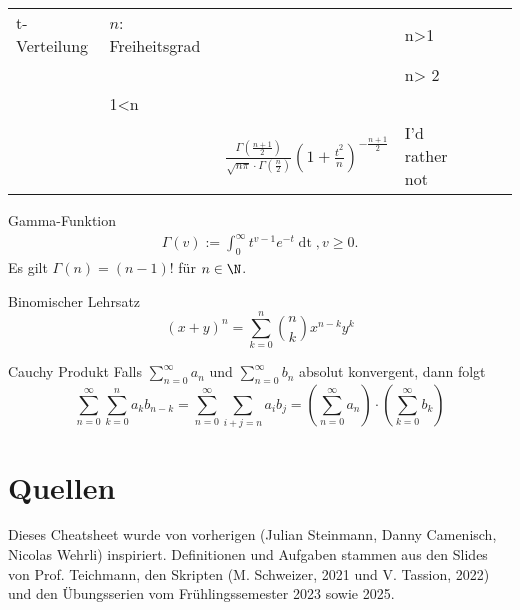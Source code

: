 \begin{center}
\begin{table*}
\begin{tabularx}{\textwidth}{llXXXX}
				t-Verteilung             & \( n \): Freiheitsgrad               & \( \begin{cases} 0 & n>1 \\ \text{undef.} & \text{sonst} \end{cases} \) & \( \begin{cases} \frac{n}{n-2} & n> 2 \\ \infty & 1<n \leq 2 \\ \text{undef.} & \text{sonst} \end{cases} \) & \( \frac{\Gamma \left( \frac{n+1}{2} \right) }{\sqrt{n\pi } \cdot \Gamma (\frac{n}{2})} \left( 1+ \frac{t^2}{n} \right) ^{- \frac{n+1}{2}} \) & I'd rather not                                \\
		
		
	
			\bottomrule
		\end{tabularx}

    \end{table*}
\end{center}

\vspace*{-1.1cm}
\begin{subbox}{Gamma-Funktion}
	\begin{align*}
		\Gamma(v) := \int_0^\infty t^{v-1}e^{-t}\mathop{dt}, v \geq 0.
	\end{align*}
	Es gilt $\Gamma(n) = (n-1)!$ für $n \in \N$.
\end{subbox}
\begin{subbox}{Binomischer Lehrsatz}
	\[(x + y)^n = \sum_{k = 0}^n  \binom{n}{k} x^{n-k}y^k\]
\end{subbox}
\break
\vspace*{12.5cm}
\begin{subbox}{Cauchy Produkt}
	Falls $\sum_{n= 0}^\infty a_n$ und $\sum_{n = 0}^\infty b_n$ absolut konvergent, dann folgt
	\[\sum_{n = 0}^\infty \sum_{k = 0}^n a_kb_{n-k} = \sum_{n = 0}^\infty \sum_{i+j = n} a_ib_j = \left(\sum_{n = 0}^\infty a_n\right) \cdot \left(\sum_{k = 0}^\infty b_k\right)\]
\end{subbox}
\section{Quellen}
Dieses Cheatsheet wurde von vorherigen (Julian Steinmann, Danny Camenisch, Nicolas Wehrli) inspiriert. Definitionen und Aufgaben stammen aus den Slides von Prof. Teichmann, den Skripten (M. Schweizer, 2021 und V. Tassion, 2022) und den Übungsserien vom Frühlingssemester 2023 sowie 2025.


